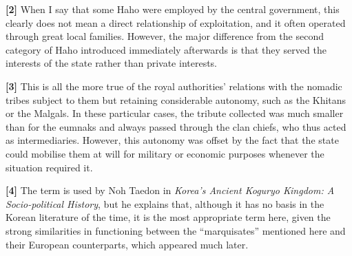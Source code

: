 \documentclass[11pt,a4paper]{article}
\begin{document}
\textbf{{[}2{]}} When I say that some Haho were employed by the central government, this clearly does not mean a direct relationship of exploitation, and it often operated through great local families. However, the major difference from the second category of Haho introduced immediately afterwards is that they served the interests of the state rather than private interests.

\textbf{{[}3{]}} This is all the more true of the royal authorities' relations with the nomadic tribes subject to them but retaining considerable autonomy, such as the Khitans or the Malgals. In these particular cases, the tribute collected was much smaller than for the eumnaks and always passed through the clan chiefs, who thus acted as intermediaries. However, this autonomy was offset by the fact that the state could mobilise them at will for military or economic purposes whenever the situation required it.

\textbf{{[}4{]}} The term is used by Noh Taedon in \emph{Korea's Ancient Koguryo Kingdom: A Socio-political History}, but he explains that, although it has no basis in the Korean literature of the time, it is the most appropriate term here, given the strong similarities in functioning between the ``marquisates'' mentioned here and their European counterparts, which appeared much later.
\end{document}
